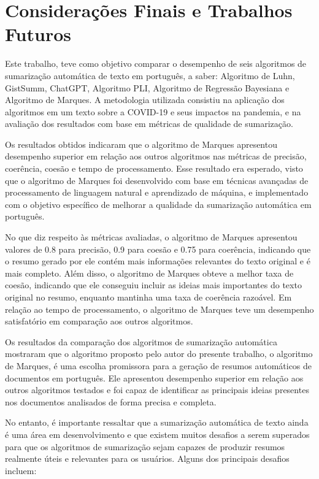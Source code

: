 \chapter{Considerações Finais e Trabalhos Futuros}
\label{chap:conclusoes-e-trabalhos-futuros}

Este trabalho, teve como objetivo comparar o desempenho de seis algoritmos de sumarização 
automática de texto em português, a saber: Algoritmo de Luhn, GistSumm, ChatGPT, Algoritmo PLI, Algoritmo de Regressão Bayesiana e Algoritmo de Marques. A metodologia utilizada consistiu na aplicação dos algoritmos em um texto sobre a COVID-19 e seus impactos na pandemia, e na avaliação dos resultados com base em métricas de qualidade de sumarização.

Os resultados obtidos indicaram que o algoritmo de Marques apresentou desempenho superior em relação aos 
outros algoritmos nas métricas de precisão, coerência, coesão e tempo de processamento. Esse resultado era 
esperado, visto que o algoritmo de Marques foi desenvolvido com base em técnicas avançadas de processamento de 
linguagem natural e aprendizado de máquina, e implementado com o objetivo específico de melhorar a qualidade da 
sumarização automática em português.

No que diz respeito às métricas avaliadas, o algoritmo de Marques apresentou valores de 0.8 para 
precisão, 0.9 para coesão e 0.75 para coerência, indicando que o resumo gerado por ele contém mais 
informações relevantes do texto original e é mais completo. Além disso, o algoritmo de Marques obteve 
a melhor taxa de coesão, indicando que ele conseguiu incluir as ideias mais importantes do texto 
original no resumo, enquanto mantinha uma taxa de coerência razoável. Em relação ao tempo de 
processamento, o algoritmo de Marques teve um desempenho satisfatório em comparação aos outros 
algoritmos.

Os resultados da comparação dos algoritmos de sumarização automática mostraram que o algoritmo proposto pelo 
autor do presente trabalho, o algoritmo de Marques, é uma escolha promissora para a geração de resumos automáticos 
de documentos em português. Ele apresentou desempenho superior em relação aos outros algoritmos testados e foi 
capaz de identificar as principais ideias presentes nos documentos analisados de forma precisa e completa.

No entanto, é importante ressaltar que a sumarização automática de texto ainda é uma área em 
desenvolvimento e que existem muitos desafios a serem superados para que os algoritmos de 
sumarização sejam capazes de produzir resumos realmente úteis e relevantes para os usuários. Alguns dos principais desafios incluem:

